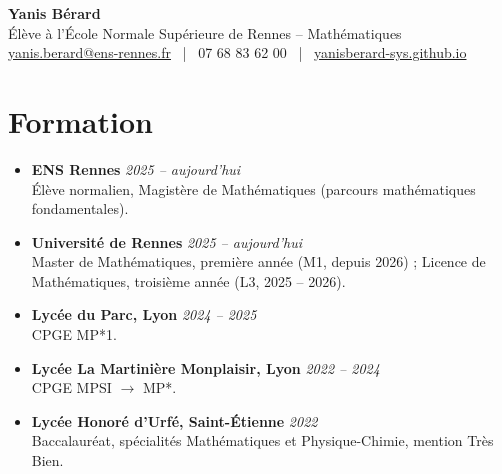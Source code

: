 \documentclass[11pt,a4paper]{article}
\begin{document}
	\pagestyle{empty}

	\begin{center}
		{\Huge \textbf{Yanis Bérard}}\\[0.2cm]
		{\Large Élève à l'École Normale Supérieure de Rennes -- Mathématiques}\\[0.2cm]
		\href{mailto:yanis.berard@ens-rennes.fr}{yanis.berard@ens-rennes.fr} ~|~ 07 68 83 62 00 ~|~ \href{https://yanisberard-sys.github.io/fr/}{yanisberard-sys.github.io}
	\end{center}

	\vspace{0cm}

	\section*{Formation}
	\begin{itemize}[leftmargin=1em, label={}]
		\item \textbf{ENS Rennes} \hfill \textit{2025 -- aujourd'hui} \\
		Élève normalien, Magistère de Mathématiques (parcours mathématiques fondamentales).
		\vspace{0.02cm}

		\item \textbf{Université de Rennes} \hfill \textit{2025 -- aujourd'hui} \\
		Master de Mathématiques, première année (M1, depuis 2026) ; Licence de Mathématiques, troisième année (L3, 2025 -- 2026).
		\vspace{0.02cm}

		\item \textbf{Lycée du Parc, Lyon} \hfill \textit{2024 -- 2025} \\
		CPGE MP*1.
		\vspace{0.02cm}

		\item \textbf{Lycée La Martinière Monplaisir, Lyon} \hfill \textit{2022 -- 2024} \\
		CPGE MPSI $\rightarrow$ MP*.
		\vspace{0.02cm}

		\item \textbf{Lycée Honoré d'Urfé, Saint-Étienne} \hfill \textit{2022} \\
		Baccalauréat, spécialités Mathématiques et Physique-Chimie, mention Très Bien.
	\end{itemize}
\end{document}
